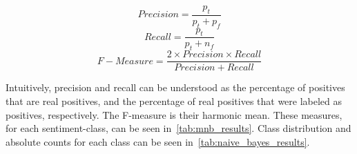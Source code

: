 \begin{equation}
    Precision = \frac{p_t}{p_t + p_f}
\end{equation}
\begin{equation}
    Recall = \frac{p_t}{p_t + n_f}
\end{equation}
\begin{equation}
    F-Measure = \frac{2 \times Precision \times Recall}{Precision + Recall}
\end{equation}

Intuitively, precision and recall can be understood as the percentage of positives that are real positives,
and the percentage of real positives that were labeled as positives, respectively.
The F-measure is their harmonic mean.
These measures, for each sentiment-class, can be seen in~\cref{tab:mnb_results}.
Class distribution and absolute counts for each class can be seen in~\cref{tab:naive_bayes_results}.

